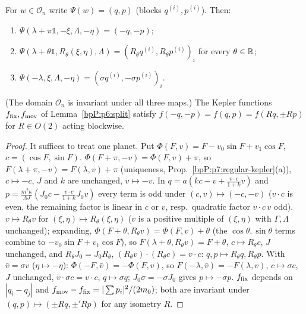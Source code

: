 \begin{proposition}\label{bpP:p8:symmetries}
For $w\in\mathcal O_n$ write $\Psi(w)=(q,p)$ (blocks $q^{(i)},p^{(i)}$). Then:
\begin{enumerate}[label=(S\arabic*)]
\item $\Psi(\lambda+\pi\mathbb 1,-\xi,\Lambda,-\eta)=(-q,-p)$;
\item $\Psi(\lambda+\theta\mathbb 1,R_\theta(\xi,\eta),\Lambda)=(R_\theta q^{(i)},R_\theta p^{(i)})_i$ for every $\theta\in\mathbb{R}$;
\item $\Psi(-\lambda,\xi,\Lambda,-\eta)=(\sigma q^{(i)},-\sigma p^{(i)})_i$.
\end{enumerate}
(The domain $\mathcal O_n$ is invariant under all three maps.) The Kepler functions $f_{\rm fix},f_{\rm mov}$ of Lemma~\ref{bpP:p6:split} satisfy $f(-q,-p)=f(q,p)=f(Rq,\pm Rp)$ for $R\in O(2)$ acting blockwise.
\end{proposition}
\begin{proof}
It suffices to treat one planet. Put $\Phi(F,v)=F-v_0\sin F+v_1\cos F$, $c=(\cos F,\sin F)$.
\label{stepP:p8:sy-1} $\Phi(F+\pi,-v)=\Phi(F,v)+\pi$, so $F(\lambda+\pi,-v)=F(\lambda,v)+\pi$ (uniqueness, Prop.~\ref{bpP:p7:regular-kepler}(a)), $c\mapsto-c$, $J$ and $k$ are unchanged, $v\mapsto-v$. In $q=a(kc-v+\tfrac{v\cdot c}{1+k}v)$ and $p=\frac{m^2\kappa}{\Lambda J}(J_0c-\tfrac{v\cdot c}{1+k}J_0v)$ every term is odd under $(c,v)\mapsto(-c,-v)$ ($v\cdot c$ is even, the remaining factor is linear in $c$ or $v$, resp.\ quadratic factor $v\cdot c\,v$ odd).
\label{stepP:p8:sy-2} $v\mapsto R_\theta v$ for $(\xi,\eta)\mapsto R_\theta(\xi,\eta)$ ($v$ is a positive multiple of $(\xi,\eta)$ with $\Gamma,\Lambda$ unchanged); expanding, $\Phi(F+\theta,R_\theta v)=\Phi(F,v)+\theta$ (the $\cos\theta,\sin\theta$ terms combine to $-v_0\sin F+v_1\cos F$), so $F(\lambda+\theta,R_\theta v)=F+\theta$, $c\mapsto R_\theta c$, $J$ unchanged, and $R_\theta J_0=J_0R_\theta$, $(R_\theta v)\cdot(R_\theta c)=v\cdot c$: $q,p\mapsto R_\theta q,R_\theta p$.
\label{stepP:p8:sy-3} With $\bar v=\sigma v$ ($\eta\mapsto-\eta$): $\Phi(-F,\bar v)=-\Phi(F,v)$, so $F(-\lambda,\bar v)=-F(\lambda,v)$, $c\mapsto\sigma c$, $J$ unchanged, $\bar v\cdot\sigma c=v\cdot c$, $q\mapsto\sigma q$; $J_0\sigma=-\sigma J_0$ gives $p\mapsto-\sigma p$.
\label{stepP:p8:sy-f} $f_{\rm fix}$ depends on $|q_i-q_j|$ and $f_{\rm mov}-f_{\rm fix}=|\sum p_i|^2/(2m_0)$; both are invariant under $(q,p)\mapsto(\pm Rq,\pm' Rp)$ for any isometry $R$.
\end{proof}

